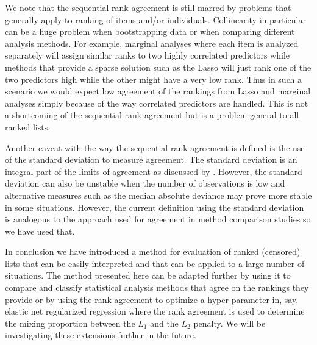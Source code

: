 \documentclass[12pt,a4paper]{article}
\theoremstyle{plain}
\begin{document}
We note that the sequential rank agreement is still marred by problems
that generally apply to ranking of items and/or
individuals. Collinearity in particular can be a huge problem when
bootstrapping data or when comparing different analysis methods. For
example, marginal analyses where each item is analyzed separately will
assign similar ranks to two highly correlated predictors while methods
that provide a sparse solution such as the Lasso will just rank one of
the two predictors high while the other might have a very low rank.
Thus in such a scenario we would expect low agreement of the rankings
from Lasso and marginal analyses simply because of the way correlated
predictors are handled. This is not a shortcoming of the sequential
rank agreement but is a problem general to all ranked lists.

Another caveat with the way the sequential rank agreement is defined
is the use of the standard deviation to measure agreement. The
standard deviation is an integral part of the limits-of-agreement as
discussed by \citet{alt:bland:1983}. However, the standard deviation
can also be unstable when the number of observations is low and
alternative measures such as the median absolute deviance may prove more
stable in some situations. However, the current definition using the
standard deviation is analogous to the approach used for agreement in
method comparison studies so we have used that.

In conclusion we have introduced a method for evaluation of ranked
(censored) lists that can be easily interpreted and that can be
applied to a large number of situations.  The method presented here
can be adapted further by using it to compare and classify statistical
analysis methods that agree on the rankings they provide or by using
the rank agreement to optimize a hyper-parameter in, say, elastic net
regularized regression where the rank agreement is used to determine
the mixing proportion between the $L_1$ and the $L_2$ penalty.
We will be investigating these extensions further in the future.


%


\end{document}
